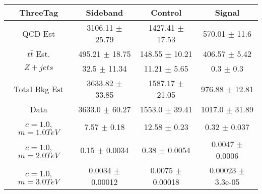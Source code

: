 \begin{footnotesize} 
\begin{tabular}{c|c|c|c} 
ThreeTag & Sideband & Control & Signal \\ 
\hline\hline 
QCD Est & 3106.11 $\pm$ 25.79 & 1427.41 $\pm$ 17.53 & 570.01 $\pm$ 11.6\\ 
$t\bar{t}$ Est.  & 495.21 $\pm$ 18.75 & 148.55 $\pm$ 10.21 & 406.57 $\pm$ 5.42\\ 
$Z+jets$ & 32.5 $\pm$ 11.34 & 11.21 $\pm$ 5.65 & 0.3 $\pm$ 0.3\\ 
Total Bkg Est & 3633.82 $\pm$ 33.85 & 1587.17 $\pm$ 21.05 & 976.88 $\pm$ 12.81\\ 
Data & 3633.0 $\pm$ 60.27 & 1553.0 $\pm$ 39.41 & 1017.0 $\pm$ 31.89\\ 
$c=1.0$,$m=1.0TeV$ & 7.57 $\pm$ 0.18 & 12.58 $\pm$ 0.23 & 0.32 $\pm$ 0.037\\ 
$c=1.0$,$m=2.0TeV$ & 0.15 $\pm$ 0.0034 & 0.38 $\pm$ 0.0054 & 0.0047 $\pm$ 0.0006\\ 
$c=1.0$,$m=3.0TeV$ & 0.0034 $\pm$ 0.00012 & 0.0075 $\pm$ 0.00018 & 0.00023 $\pm$ 3.3e-05\\ 
\hline\hline 
\end{tabular} 
\end{footnotesize} 
\newline 
